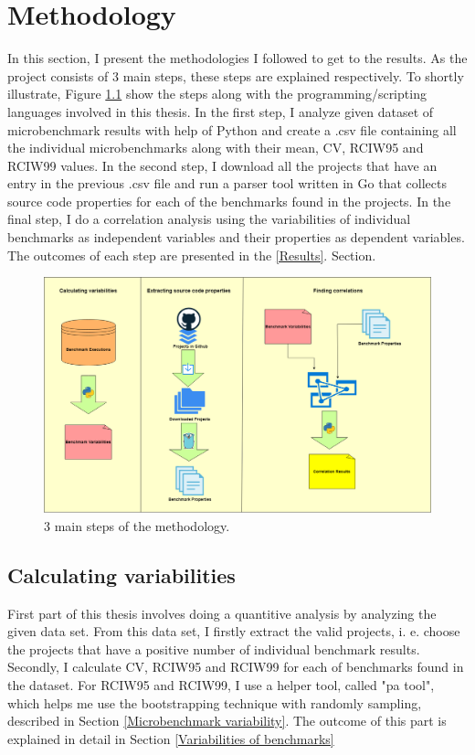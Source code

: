 \documentclass{seal_thesis}
\begin{document}
\chapter{Methodology}
\label{Methodology}
In this section, I present the methodologies I followed to get to the results. As the project consists of 3 main steps, these steps are explained respectively. To shortly illustrate, Figure \ref{fig:Methodology} show the steps along with the programming/scripting languages involved in this thesis. In the first step, I analyze given dataset of microbenchmark results with help of Python and create a .csv file containing all the individual microbenchmarks along with their mean, CV, RCIW95 and RCIW99 values. In the second step, I download all the projects that have an entry in the previous .csv file and run a parser tool written in Go that collects source code properties for each of the benchmarks found in the projects. In the final step, I do a correlation analysis using the variabilities of individual benchmarks as independent variables and their properties as dependent variables. The outcomes of each step are presented in the \ref{Results}. Section.

\begin{figure}[H]
	\centering
	\includegraphics[width=\linewidth]{Methodology}
	\caption{3 main steps of the methodology.}
	\label{fig:Methodology}
\end{figure}

\section{Calculating variabilities}
\label{Calculating variabilities}

First part of this thesis involves doing a quantitive analysis by analyzing the given data set. From this data set, I firstly extract the valid projects, i. e. choose the projects that have a positive number of individual benchmark results. Secondly, I calculate CV, RCIW95 and RCIW99 for each of benchmarks found in the dataset. For RCIW95 and RCIW99, I use a helper tool, called "pa tool", which helps me use the bootstrapping technique with randomly sampling, described in Section \ref{Microbenchmark variability}. The outcome of this part is explained in detail in Section \ref{Variabilities of benchmarks}
\end{document}
